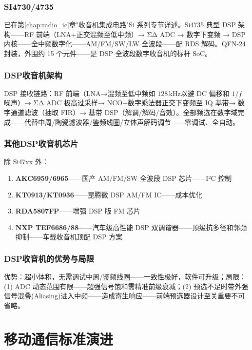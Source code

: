 \documentclass[12pt,UTF8]{ctexbook}
\begin{document}
\subsection{SI4730/4735}

已在第\ref{chap:radio_ic}章"收音机集成电路"Si 系列专节详述。Si4735 典型 DSP 架构——RF 前端（LNA+正交混频至低中频）→ ΣΔ ADC → 数字下变频 → DSP 内核——全中频数字化——AM/FM/SW/LW 全波段——配 RDS 解码。QFN-24 封装，外围约 15 个元件——是 DSP 全波段数字收音机的标杆 SoC。

\subsection{DSP收音机架构}

DSP 接收链路：RF 前端（LNA→混频至低中频如 $128\,\mathrm{kHz}$以避 DC 偏移和 $1/f$ 噪声）→ ΣΔ ADC 极高过采样→ NCO+数字乘法器正交下变频至 IQ 基带→ 数字通道滤波（抽取 FIR）→ 基带 DSP（解调/解码/音效）。全部频选在数字域完成——代替中周/陶瓷滤波器/鉴频线圈/立体声解码调节——零调试、全自动。

\subsection{其他DSP收音机芯片}

除 Si47xx 外：
\begin{enumerate}
\item \textbf{AKC6959/6965}——国产 AM/FM/SW 全波段 DSP 芯片——I²C 控制
\item \textbf{KT0913/KT0936}——昆腾微 DSP AM/FM IC——成本优化
\item \textbf{RDA5807FP}——增强 DSP 版 FM 芯片
\item \textbf{NXP TEF6686/88}——汽车级高性能 DSP 双调谐器——顶级抗多径和邻频抑制——车载收音机顶配 DSP 方案
\end{enumerate}

\subsection{DSP收音机的优势与局限}

优势：超小体积，无需调试中周/鉴频线圈——一致性极好，软件可升级；局限：(1) ADC 动态范围有限——超强信号饱和需精准前级衰减；(2) 预选不足时带外强信号混叠(Aliasing)进入中频——造成寄生响应——前端预选器设计至关重要不可省略。

\chapter{移动通信标准演进}
\label{chap:mobile_comm}
\end{document}

